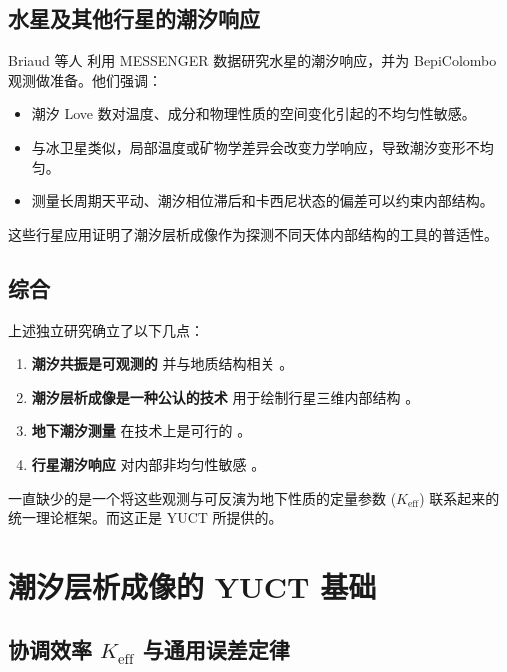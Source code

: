 \documentclass[12pt,a4paper]{article}
\theoremstyle{remark}
\newcommand{\Keff}{K_{\mathrm{eff}}}
\begin{document}
	\subsection{水星及其他行星的潮汐响应}
	
	Briaud 等人 \cite{Briaud2025} 利用 MESSENGER 数据研究水星的潮汐响应，并为 BepiColombo 观测做准备。他们强调：
	
	\begin{itemize}
		\item 潮汐 Love 数对温度、成分和物理性质的空间变化引起的不均匀性敏感。
		\item 与冰卫星类似，局部温度或矿物学差异会改变力学响应，导致潮汐变形不均匀。
		\item 测量长周期天平动、潮汐相位滞后和卡西尼状态的偏差可以约束内部结构。
	\end{itemize}
	
	这些行星应用证明了潮汐层析成像作为探测不同天体内部结构的工具的普适性。
	
	\subsection{综合}
	
	上述独立研究确立了以下几点：
	
	\begin{enumerate}
		\item \textbf{潮汐共振是可观测的} 并与地质结构相关 \cite{Sibgatulin2014}。
		\item \textbf{潮汐层析成像是一种公认的技术} 用于绘制行星三维内部结构 \cite{RoviraNavarro2025}。
		\item \textbf{地下潮汐测量} 在技术上是可行的 \cite{Rogister2024}。
		\item \textbf{行星潮汐响应} 对内部非均匀性敏感 \cite{Briaud2025}。
	\end{enumerate}
	
	一直缺少的是一个将这些观测与可反演为地下性质的定量参数 ($\Keff$) 联系起来的统一理论框架。而这正是 YUCT 所提供的。
	
	\section{潮汐层析成像的 YUCT 基础}
	\label{sec:yuct-foundations}
	
	\subsection{协调效率 $\Keff$ 与通用误差定律}
	
\end{document}
